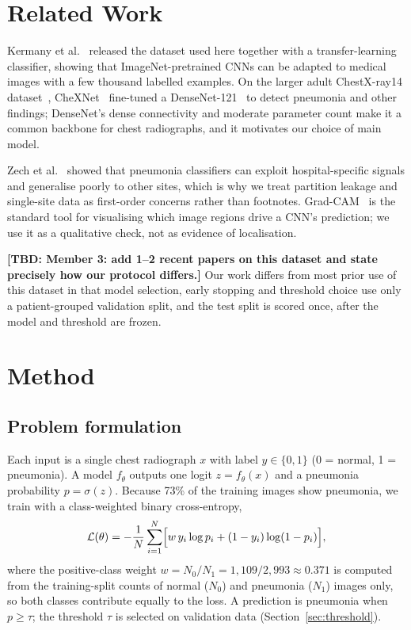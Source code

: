 \documentclass[conference]{IEEEtran}
\newcommand{\TBD}[1]{{\color{red}\textbf{[TBD: #1]}}}
\begin{document}
\section{Related Work}
\label{sec:related}
Kermany et al.~\cite{kermany2018} released the dataset used here together with a transfer-learning classifier, showing that ImageNet-pretrained CNNs can be adapted to medical images with a few thousand labelled examples. On the larger adult ChestX-ray14 dataset~\cite{wang2017}, CheXNet~\cite{rajpurkar2017} fine-tuned a DenseNet-121~\cite{huang2017} to detect pneumonia and other findings; DenseNet's dense connectivity and moderate parameter count make it a common backbone for chest radiographs, and it motivates our choice of main model.

Zech et al.~\cite{zech2018} showed that pneumonia classifiers can exploit hospital-specific signals and generalise poorly to other sites, which is why we treat partition leakage and single-site data as first-order concerns rather than footnotes. Grad-CAM~\cite{selvaraju2017} is the standard tool for visualising which image regions drive a CNN's prediction; we use it as a qualitative check, not as evidence of localisation.

\TBD{Member 3: add 1--2 recent papers on this dataset and state precisely how our protocol differs.} Our work differs from most prior use of this dataset in that model selection, early stopping and threshold choice use only a patient-grouped validation split, and the test split is scored once, after the model and threshold are frozen.

\section{Method}
\label{sec:method}

\subsection{Problem formulation}
Each input is a single chest radiograph $x$ with label $y\in\{0,1\}$ (0 = normal, 1 = pneumonia). A model $f_\theta$ outputs one logit $z=f_\theta(x)$ and a pneumonia probability $p=\sigma(z)$. Because 73\% of the training images show pneumonia, we train with a class-weighted binary cross-entropy,
\begin{equation}
\mathcal{L}(\theta) = -\frac{1}{N}\sum_{i=1}^{N}\Bigl[w\,y_i\log p_i + (1-y_i)\log(1-p_i)\Bigr],\label{eq:loss}
\end{equation}
where the positive-class weight $w=N_0/N_1=1{,}109/2{,}993\approx0.371$ is computed from the training-split counts of normal ($N_0$) and pneumonia ($N_1$) images only, so both classes contribute equally to the loss. A prediction is pneumonia when $p\geq\tau$; the threshold $\tau$ is selected on validation data (Section~\ref{sec:threshold}).
\end{document}
